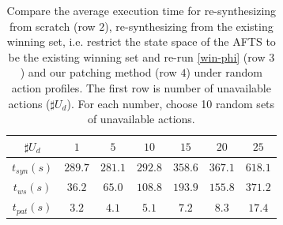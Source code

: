 \begin{table}
	\centering
	\caption{Compare the average execution time for re-synthesizing from scratch (row $ 2 $), re-synthesizing from the existing winning set, i.e. restrict the state space of the AFTS to be the existing winning set and re-run \eqref{win-phi} (row $ 3 $) and our patching method (row $ 4 $) under random action profiles. The first row is number of unavailable actions ($ \sharp U_d $). For each number, choose 10 random sets of unavailable actions.}
	\begin{tabular}{ccccccc}
		\hline 
		$ \sharp U_d $ & $ 1 $ &$ 5 $ & $ 10 $ & $ 15 $ & $ 20 $ & $ 25 $ \\ 
		\hline 
		$ t_{syn}(s) $ & $ 289.7 $ & $ 281.1 $ & $ 292.8 $ & $ 358.6 $ &  $ 367.1 $ & $ 618.1 $ \\
		$t_{ws} (s)$ & $ 36.2 $ & $ 65.0 $ & $ 108.8 $ & $ 193.9 $ & $ 155.8 $ & $ 371.2 $\\
		$ t_{pat}(s)$ & $ 3.2 $ & $ 4.1 $ & $ 5.1 $ & $ 7.2 $ & $ 8.3 $ & $ 17.4 $ \\ 
		\hline 
	\end{tabular} 
	\label{tab: exper2}
\end{table}

